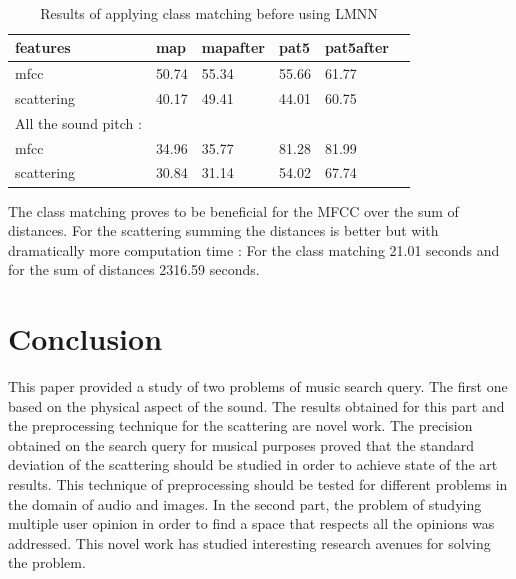 \documentclass[hidelinks,12pt]{report}
\begin{document}
\begin{enumerate}
 \begin{table}[H] 
\begin{center} 
\ 
 \setlength{\tabcolsep}{.16667em} 
\begin{tabular}{ | l | l | l | l | l | l |}
\hline
features & map & mapafter & pat5 & pat5after\\ 
\hline 
mfcc & 50.74 & 55.34 & 55.66 & 61.77 \\ 
scattering & 40.17 & 49.41 & 44.01 & 60.75  \\  

\hline All the sound pitch :
\\
\hline
mfcc & 34.96 & 35.77 & 81.28 & 81.99 \\ 
scattering & 30.84  & 31.14 & 54.02 & 67.74 \\  
\hline
\end{tabular} 
\end{center} 
\caption{Results of applying class matching before using LMNN} 
\label{you} 
\end{table}  
The class matching proves to be beneficial for the MFCC over the sum of distances. For the scattering summing the distances is better but with dramatically more computation time : For the class matching 21.01 seconds and for the sum of distances 2316.59 seconds.  
\end{enumerate}

\section{Conclusion}
This paper provided a study of two problems of music search query. The first one based on the physical aspect of the sound. The results obtained for this part and the preprocessing technique for the scattering are novel work. The precision obtained on the search query for musical purposes proved that the standard deviation of the scattering should be studied in order to achieve state of the art results. This technique of preprocessing should be tested for different problems in the domain of audio and images.
In the second part, the problem of studying multiple user opinion in order to find a space that respects all the opinions was addressed. This novel work has studied interesting research avenues for solving the problem.
\end{document}
